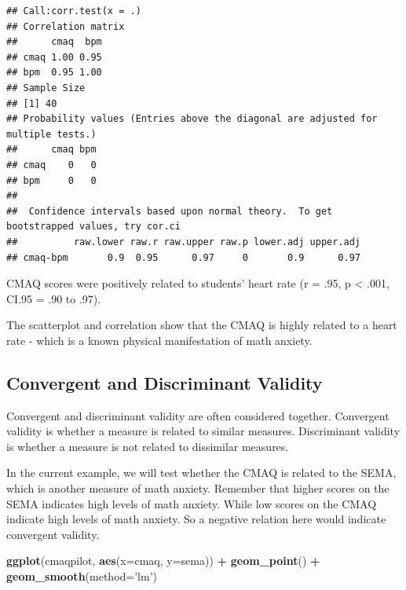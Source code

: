 \documentclass[
]{book}
\newenvironment{Shaded}{\begin{snugshade}}{\end{snugshade}}
\newcommand{\DataTypeTok}[1]{\textcolor[rgb]{0.13,0.29,0.53}{#1}}
\newcommand{\KeywordTok}[1]{\textcolor[rgb]{0.13,0.29,0.53}{\textbf{#1}}}
\newcommand{\NormalTok}[1]{#1}
\newcommand{\OperatorTok}[1]{\textcolor[rgb]{0.81,0.36,0.00}{\textbf{#1}}}
\newcommand{\StringTok}[1]{\textcolor[rgb]{0.31,0.60,0.02}{#1}}
\begin{document}
\begin{verbatim}
## Call:corr.test(x = .)
## Correlation matrix 
##      cmaq  bpm
## cmaq 1.00 0.95
## bpm  0.95 1.00
## Sample Size 
## [1] 40
## Probability values (Entries above the diagonal are adjusted for multiple tests.) 
##      cmaq bpm
## cmaq    0   0
## bpm     0   0
## 
##  Confidence intervals based upon normal theory.  To get bootstrapped values, try cor.ci
##          raw.lower raw.r raw.upper raw.p lower.adj upper.adj
## cmaq-bpm       0.9  0.95      0.97     0       0.9      0.97
\end{verbatim}

CMAQ scores were positively related to students' heart rate (r = .95, p \textless{} .001, CI.95 = .90 to .97).

The scatterplot and correlation show that the CMAQ is highly related to a heart rate - which is a known physical manifestation of math anxiety.

\hypertarget{convergent-and-discriminant-validity}{%
\subsection{Convergent and Discriminant Validity}\label{convergent-and-discriminant-validity}}

Convergent and discriminant validity are often considered together. Convergent validity is whether a measure is related to similar measures. Discriminant validity is whether a measure is not related to dissimilar measures.

In the current example, we will test whether the CMAQ is related to the SEMA, which is another measure of math anxiety. Remember that higher scores on the SEMA indicates high levels of math anxiety. While low scores on the CMAQ indicate high levels of math anxiety. So a negative relation here would indicate convergent validity.

\begin{Shaded}
\begin{Highlighting}[]
\KeywordTok{ggplot}\NormalTok{(cmaqpilot, }\KeywordTok{aes}\NormalTok{(}\DataTypeTok{x=}\NormalTok{cmaq, }\DataTypeTok{y=}\NormalTok{sema)) }\OperatorTok{+}
\StringTok{  }\KeywordTok{geom_point}\NormalTok{() }\OperatorTok{+}
\StringTok{  }\KeywordTok{geom_smooth}\NormalTok{(}\DataTypeTok{method=}\StringTok{'lm'}\NormalTok{)}
\end{Highlighting}
\end{Shaded}
\end{document}
